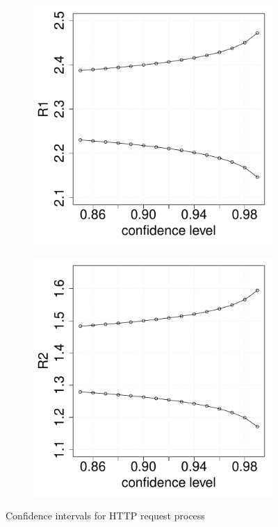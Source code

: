 \documentclass{article}
\begin{document}
\begin{figure}
\begin{subfigure}{0.4\textwidth}
	\end{subfigure}
	\begin{subfigure}{0.4\textwidth}
		\includegraphics[width=\linewidth]{images/R1-WebApplication.pdf}
	\end{subfigure}
	\begin{subfigure}{0.4\textwidth}
		\includegraphics[width=\linewidth]{images/R2-WebApplication.pdf}
	\end{subfigure}
\caption{Confidence intervals for HTTP request process\label{fig:CI-WebApplication}}
\end{figure}
\end{document}
